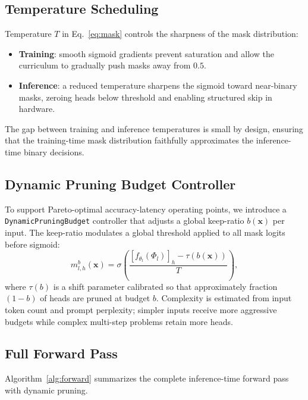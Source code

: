 \documentclass{article}
\begin{document}
\subsection{Temperature Scheduling}
\label{sec:method_temp}

Temperature $T$ in Eq.~\eqref{eq:mask} controls the sharpness of the mask distribution:

\begin{itemize}
  \item \textbf{Training}: smooth sigmoid gradients prevent saturation and allow the
        curriculum to gradually push masks away from $0.5$.
  \item \textbf{Inference}: a reduced temperature sharpens the sigmoid toward near-binary
        masks, zeroing heads below threshold and enabling structured skip in hardware.
\end{itemize}

The gap between training and inference temperatures is small by design, ensuring that the
training-time mask distribution faithfully approximates the inference-time binary decisions.

\subsection{Dynamic Pruning Budget Controller}
\label{sec:method_budget}

To support Pareto-optimal accuracy-latency operating points, we introduce a
\texttt{DynamicPruningBudget} controller that adjusts a global keep-ratio $b(\mathbf{x})$
per input. The keep-ratio modulates a global threshold applied to all mask logits before
sigmoid:
\[
  m^{b}_{l,h}(\mathbf{x}) = \sigma\!\left(
    \frac{[f_{\theta_l}(\Phi_l)]_h - \tau(b(\mathbf{x}))}{T}
  \right),
\]
where $\tau(b)$ is a shift parameter calibrated so that approximately fraction $(1-b)$ of
heads are pruned at budget $b$. Complexity is estimated from input token count and prompt
perplexity; simpler inputs receive more aggressive budgets while complex multi-step problems
retain more heads.

\subsection{Full Forward Pass}
\label{sec:method_forward}

Algorithm~\ref{alg:forward} summarizes the complete inference-time forward pass with dynamic
pruning.
\end{document}
